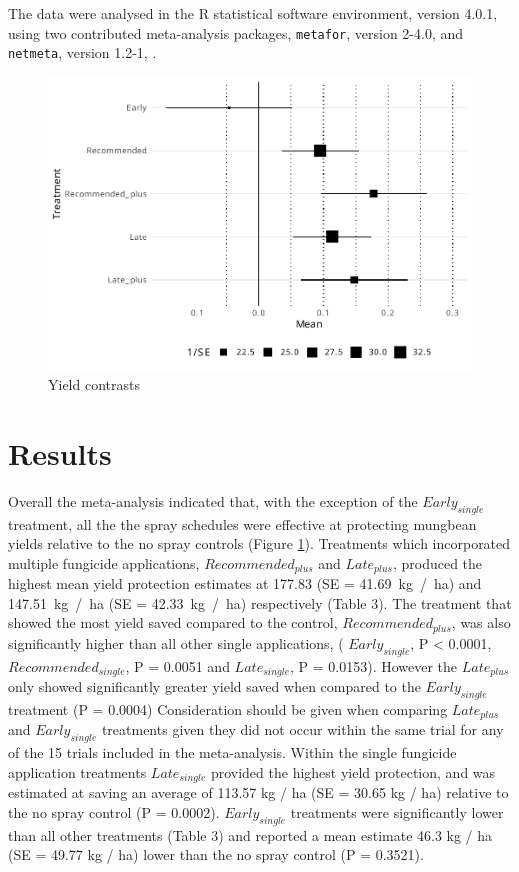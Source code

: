 \documentclass[agronomy,article,submit,moreauthors,pdftex]{mdpi}
\begin{document}
The data were analysed in the R statistical software environment, version 4.0.1, \citep{RCoreTeam2020} using two contributed meta-analysis packages, \texttt{metafor}, version 2-4.0, \citep{Viechtbauer2010} and \texttt{netmeta}, version 1.2-1, \citep{Rucker2020}.

\begin{figure}
\centering
\includegraphics{paper_files/figure-latex/Figure1-1.pdf}
\caption{\label{fig:Figure1}Yield contrasts}
\end{figure}

\hypertarget{results}{%
\section{Results}\label{results}}

Overall the meta-analysis indicated that, with the exception of the \(Early_{single}\) treatment, all the the spray schedules were effective at protecting mungbean yields relative to the no spray controls (Figure \ref{fig:Figure1}).
Treatments which incorporated multiple fungicide applications, \(Recommended_{plus}\) and \(Late_{plus}\), produced the highest mean yield protection estimates at 177.83 (SE = 41.69~kg~/~ha) and 147.51~kg~/~ha (SE = 42.33~kg~/~ha) respectively (Table 3).
The treatment that showed the most yield saved compared to the control, \(Recommended_{plus}\), was also significantly higher than all other single applications, (
\(Early_{single}\), P \textless{} 0.0001,
\(Recommended_{single}\), P = 0.0051 and
\(Late_{single}\), P = 0.0153).
However the \(Late_{plus}\) only showed significantly greater yield saved when compared to the \(Early_{single}\) treatment (P = 0.0004)
Consideration should be given when comparing \(Late_{plus}\) and \(Early_{single}\) treatments given they did not occur within the same trial for any of the 15 trials included in the meta-analysis.
Within the single fungicide application treatments \(Late_{single}\) provided the highest yield protection, and was estimated at saving an average of 113.57 kg / ha (SE = 30.65 kg / ha) relative to the no spray control (P = 0.0002).
\(Early_{single}\) treatments were significantly lower than all other treatments (Table 3) and reported a mean estimate 46.3 kg / ha (SE = 49.77 kg / ha) lower than the no spray control (P = 0.3521).
\end{document}
